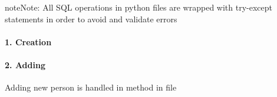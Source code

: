 \documentclass[letterpaper,10pt,english]{sphinxmanual}
\begin{document}
\begin{sphinxadmonition}{note}{Note:}
All SQL operations in python files are wrapped with try-except statements in order to avoid and validate errors
\end{sphinxadmonition}


\paragraph{1. Creation}
\label{\detokenize{developer/mehmet:creation}}
\begin{sphinxVerbatim}[commandchars=\\\{\}]
          
   
 
  
 
 
 
\end{sphinxVerbatim}


\paragraph{2. Adding}
\label{\detokenize{developer/mehmet:adding}}
Adding new person is handled in  method in  file
\end{document}
